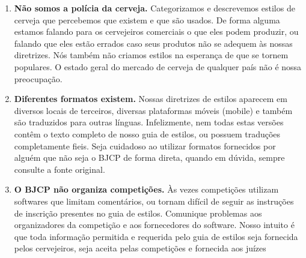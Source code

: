 \begin{enumerate}
\item \textbf{Não somos a polícia da cerveja.} Categorizamos e descrevemos estilos de cerveja que percebemos que existem e que são usados. De forma alguma estamos falando para os cervejeiros comerciais o que eles podem produzir, ou falando que eles estão errados caso seus produtos não se adequem às nossas diretrizes. Nós também não criamos estilos na esperança de que se tornem populares. O estado geral do mercado de cerveja de qualquer país não é nossa preocupação.
\item \textbf{Diferentes formatos existem.} Nossas diretrizes de estilos aparecem em diversos locais de terceiros, diversas plataformas móveis (mobile) e também são traduzidos para outras línguas. Infelizmente, nem todas estas versões contêm o texto completo de nosso guia de estilos, ou possuem traduções completamente fieis. Seja cuidadoso ao utilizar formatos fornecidos por alguém que não seja o BJCP de forma direta, quando em dúvida, sempre consulte a fonte original.
\item \textbf{O BJCP não organiza competições.} Às vezes competições utilizam softwares que limitam comentários, ou tornam difícil de seguir as instruções de inscrição presentes no guia de estilos. Comunique problemas aos organizadores da competição e aos fornecedores do software. Nosso intuito é que toda informação permitida e requerida pelo guia de estilos seja fornecida pelos cervejeiros, seja aceita pelas competições e fornecida aos juízes
\end{enumerate}